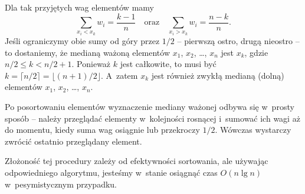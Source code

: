 \bignegskip

\subproblem %
Dla tak przyjętych wag elementów mamy
\[
	\sum_{x_i<x_k}w_i = \frac{k-1}{n} \quad\text{oraz}\quad \sum_{x_i>x_k}w_i = \frac{n-k}{n}.
\]
Jeśli ograniczymy obie sumy od góry przez $1/2$ -- pierwszą ostro, drugą nieostro -- to dostaniemy, że medianą ważoną elementów $x_1$, $x_2$, \dots, $x_n$ jest $x_k$, gdzie $n/2\le k<n/2+1$.
Ponieważ $k$ jest całkowite, to musi być $k=\lceil n/2\rceil=\lfloor(n+1)/2\rfloor$.
A~zatem $x_k$ jest również zwykłą medianą (dolną) elementów $x_1$, $x_2$, \dots, $x_n$.

\subproblem %
Po posortowaniu elementów wyznaczenie mediany ważonej odbywa się w~prosty sposób -- należy przeglądać elementy w~kolejności rosnącej i~sumować ich wagi aż do momentu, kiedy suma wag osiągnie lub przekroczy $1/2$.
Wówczas wystarczy zwrócić ostatnio przeglądany element.

Złożoność tej procedury zależy od efektywności sortowania, ale używając odpowiedniego algorytmu, jesteśmy w~stanie osiągnąć czas $O(n\lg n)$ w~pesymistycznym przypadku.


